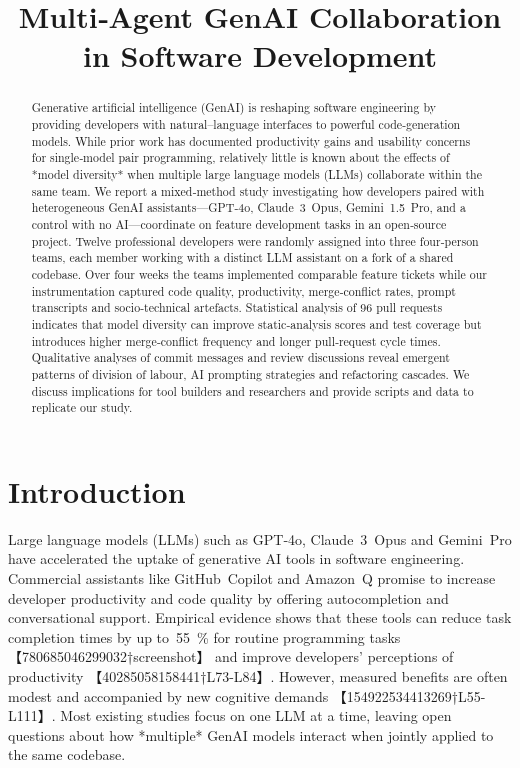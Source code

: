 \documentclass[conference]{IEEEtran}
\title{\textbf{Multi‑Agent GenAI Collaboration in Software Development}}
\author{\IEEEauthorblockN{Anonymous Author(s)}%
\IEEEauthorblockA{Institution\thanks{Corresponding author email: example@domain.com}}}
\begin{document}
\maketitle

\begin{abstract}
Generative artificial intelligence (GenAI) is reshaping software engineering by providing developers with natural–language interfaces to powerful code‑generation models.  While prior work has documented productivity gains and usability concerns for single‑model pair programming, relatively little is known about the effects of *model diversity* when multiple large language models (LLMs) collaborate within the same team.  We report a mixed‑method study investigating how developers paired with heterogeneous GenAI assistants—GPT‑4o, Claude 3 Opus, Gemini 1.5 Pro, and a control with no AI—coordinate on feature development tasks in an open‑source project.  Twelve professional developers were randomly assigned into three four‑person teams, each member working with a distinct LLM assistant on a fork of a shared codebase.  Over four weeks the teams implemented comparable feature tickets while our instrumentation captured code quality, productivity, merge‑conflict rates, prompt transcripts and socio‑technical artefacts.  Statistical analysis of 96 pull requests indicates that model diversity can improve static‑analysis scores and test coverage but introduces higher merge‑conflict frequency and longer pull‑request cycle times.  Qualitative analyses of commit messages and review discussions reveal emergent patterns of division of labour, AI prompting strategies and refactoring cascades.  We discuss implications for tool builders and researchers and provide scripts and data to replicate our study.
\end{abstract}

\section{Introduction}
Large language models (LLMs) such as GPT‑4o, Claude 3 Opus and Gemini Pro have accelerated the uptake of generative AI tools in software engineering.  Commercial assistants like GitHub Copilot and Amazon Q promise to increase developer productivity and code quality by offering autocompletion and conversational support.  Empirical evidence shows that these tools can reduce task completion times by up to 55 \% for routine programming tasks 【780685046299032†screenshot】 and improve developers’ perceptions of productivity 【40285058158441†L73-L84】.  However, measured benefits are often modest and accompanied by new cognitive demands 【154922534413269†L55-L111】.  Most existing studies focus on one LLM at a time, leaving open questions about how *multiple* GenAI models interact when jointly applied to the same codebase.
\end{document}
